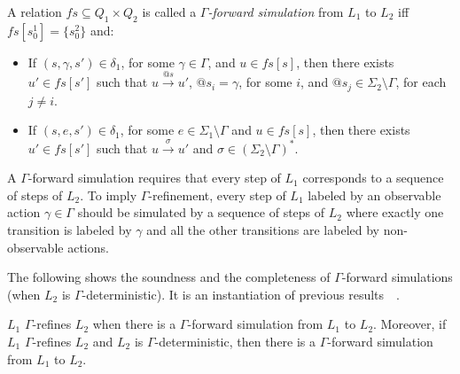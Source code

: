 \vspace{-1.5mm}
\begin{definition}
A relation $\mathit{fs} \subseteq Q_{1} \times Q_{2}$ is called a \emph{$\Gamma$-forward simulation} from $L_1$ to $L_2$ if{f} $\mathit{fs}[s_0^1] = \{s_0^2 \}$ and:
\vspace{-1.5mm}
\begin{itemize}
\item If $(s,\gamma,s') \in \delta_1$, for some $\gamma\in \Gamma$, and $u \in \mathit{fs}[s]$, then there exists $u' \in \mathit{fs}[s']$ such that $u \xrightarrow{@s} u'$, $@s_i=\gamma$, for some $i$, and $@s_j\in \Sigma_2\setminus\Gamma$, for each $j\neq i$.
\item If $(s,e,s') \in \delta_1$, for some $e \in \Sigma_1\setminus \Gamma$ and $u \in \mathit{fs}[s]$, then there exists $u' \in \mathit{fs}[s']$ such that $u \xrightarrow{\sigma} u'$ and $\sigma\in (\Sigma_2\setminus\Gamma)^*$.  
\end{itemize}
\vspace{-3.5mm}
\end{definition}
A $\Gamma$-forward simulation requires that every step of $L_1$ corresponds to a sequence of steps of $L_2$. To imply $\Gamma$-refinement, every step of $L_1$ labeled by an observable action $\gamma\in \Gamma$ should be simulated by a sequence of steps of $L_2$ where exactly one transition is labeled by $\gamma$ and all the other transitions are labeled by non-observable actions.

The following shows the soundness and the completeness of $\Gamma$-forward simulations (when $L_2$ is $\Gamma$-deterministic). It is an instantiation of previous results~~\cite{DBLP:journals/tcs/AbadiL91,DBLP:journals/iandc/LynchV95}.

\vspace{-1.5mm}
\begin{theorem}\label{th:forSim}
$L_1$ $\Gamma$-refines $L_2$ when there is a $\Gamma$-forward simulation from $L_1$ to $L_2$. Moreover, if $L_1$ $\Gamma$-refines $L_2$ and $L_2$ is $\Gamma$-deterministic, then there is a $\Gamma$-forward simulation from $L_1$ to $L_2$.
\vspace{-1.5mm}
\end{theorem}


